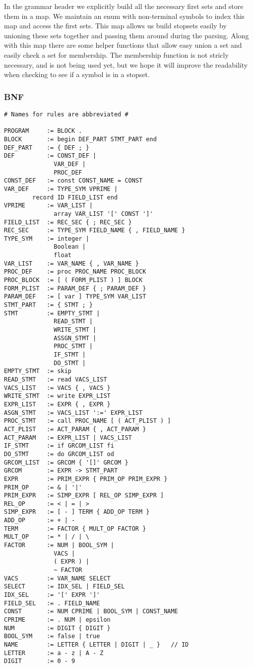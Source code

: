 \documentclass{article}
\begin{document}
In the grammar header we explicitly build all the necessary first sets and store them in a map.
We maintain an enum with non-terminal symbols to index this map and access the first sets.
This map allows us build stopsets easily by unioning these sets together and passing them around during the parsing.
Along with this map there are some helper functions that allow easy union a set and easily check a set for membership.
The membership function is not stricly necessary, and is not being used yet, but we hope it will
improve the readability when checking to see if a symbol is in a stopset.

\subsubsection{BNF}

\begin{verbatim}
# Names for rules are abbreviated #

PROGRAM     := BLOCK .
BLOCK       := begin DEF_PART STMT_PART end
DEF_PART    := { DEF ; }
DEF         := CONST_DEF |
              VAR_DEF |
              PROC_DEF
CONST_DEF   := const CONST_NAME = CONST
VAR_DEF     := TYPE_SYM VPRIME |
        record ID FIELD_LIST end
VPRIME      := VAR_LIST |
              array VAR_LIST '[' CONST ']'
FIELD_LIST  := REC_SEC { ; REC_SEC }
REC_SEC     := TYPE_SYM FIELD_NAME { , FIELD_NAME }
TYPE_SYM    := integer |
              Boolean |
              float
VAR_LIST    := VAR_NAME { , VAR_NAME }
PROC_DEF    := proc PROC_NAME PROC_BLOCK
PROC_BLOCK  := [ ( FORM_PLIST ) ] BLOCK
FORM_PLIST  := PARAM_DEF { ; PARAM_DEF }
PARAM_DEF   := [ var ] TYPE_SYM VAR_LIST
STMT_PART   := { STMT ; }
STMT        := EMPTY_STMT |
              READ_STMT |
              WRITE_STMT |
              ASSGN_STMT |
              PROC_STMT |
              IF_STMT |
              DO_STMT |
EMPTY_STMT  := skip
READ_STMT   := read VACS_LIST
VACS_LIST   := VACS { , VACS }
WRITE_STMT  := write EXPR_LIST
EXPR_LIST   := EXPR { , EXPR }
ASGN_STMT   := VACS_LIST ':=' EXPR_LIST
PROC_STMT   := call PROC_NAME [ ( ACT_PLIST ) ]
ACT_PLIST   := ACT_PARAM { , ACT_PARAM }
ACT_PARAM   := EXPR_LIST | VACS_LIST
IF_STMT     := if GRCOM_LIST fi
DO_STMT     := do GRCOM_LIST od
GRCOM_LIST  := GRCOM { '[]' GRCOM }
GRCOM       := EXPR -> STMT_PART
EXPR        := PRIM_EXPR { PRIM_OP PRIM_EXPR }
PRIM_OP     := & | '|'
PRIM_EXPR   := SIMP_EXPR [ REL_OP SIMP_EXPR ]
REL_OP      := < | = | >
SIMP_EXPR   := [ - ] TERM { ADD_OP TERM }
ADD_OP      := + | -
TERM        := FACTOR { MULT_OP FACTOR }
MULT_OP     := * | / | \
FACTOR      := NUM | BOOL_SYM |
              VACS |
              ( EXPR ) |
              ~ FACTOR
VACS        := VAR_NAME SELECT
SELECT      := IDX_SEL | FIELD_SEL
IDX_SEL     := '[' EXPR ']'
FIELD_SEL   := . FIELD_NAME
CONST       := NUM CPRIME | BOOL_SYM | CONST_NAME
CPRIME      := . NUM | epsilon
NUM         := DIGIT { DIGIT }
BOOL_SYM    := false | true
NAME        := LETTER { LETTER | DIGIT | _ }   // ID
LETTER      := a - z | A - Z
DIGIT       := 0 - 9
\end{verbatim}
\end{document}
